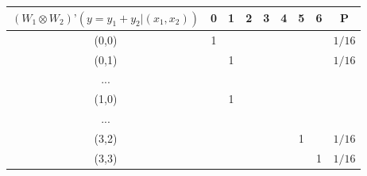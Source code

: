 \begin{tabular}{c|c|c|c|c|c|c|c||c|}
$(W_1 \otimes W_2)’( y =y_1 + y_2 | (x_1, x_2))$ & 0 & 1 & 2 & 3 & 4 & 5 & 6 & P      \\ \hline
(0,0)             & 1 &   &   &   &   &   &   & $1/16$ \\ \hline
(0,1)             &   & 1 &   &   &   &   &   & $1/16$ \\ \hline
...               &   &   &   &   &   &   &   &        \\ \hline
(1,0)             &  & 1 &   &   &   &   &   &        \\ \hline
...               &   &   &   &   &   &   &   &        \\ \hline
(3,2)             &   &   &   &   &   & 1 &   & $1/16$ \\ \hline
(3,3)             &   &   &   &   &   &   & 1 & $1/16$ \\ \hline
\end{tabular}